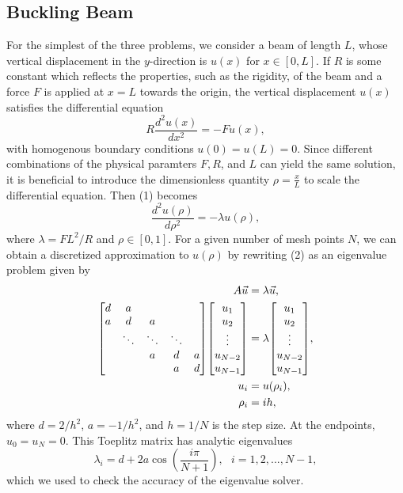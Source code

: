 \documentclass[prb,aps,twocolumn,showpacs,10pt]{revtex4-1}
\newenvironment{psmallmatrix}
  {\left[\begin{matrix}}
  {\end{matrix}\right]}
\begin{document}
\subsection{Buckling Beam}
For the simplest of the three problems, we consider a beam of length $L$, whose vertical displacement in the $y$-direction is $u(x)$ for $x \in [0,L]$. If $R$ is some constant which reflects the properties, such as the rigidity, of the beam and a force $F$ is applied at $x=L$ towards the origin, the vertical displacement $u(x)$ satisfies the differential equation
\begin{equation}
R\frac{d^2 u(x)}{dx^2} = -Fu(x),
\end{equation}
with homogenous boundary conditions $u(0)=u(L)=0$. Since different combinations of the physical paramters $F, R$, and $L$ can yield the same solution, it is beneficial to introduce the dimensionless quantity $\rho = \frac{x}{L}$ to scale the differential equation. Then (1) becomes
\begin{equation}
\frac{d^2 u(\rho)}{d\rho^2} = -\lambda u(\rho),
\end{equation}
where $\lambda = FL^2/R$ and $\rho \in [0,1]$. For a given number of mesh points $N$, we can obtain a discretized approximation to $u(\rho)$ by rewriting (2) as an eigenvalue problem given by
\begin{align}
\label{eqn:eqlabel}
\begin{split}
A\vec{u} &= \lambda \vec{u},
\\
\begin{psmallmatrix} d&a& \\
a&d&a\\
&\ddots&\ddots&\ddots\\
&&a&d&a\\
&&&a&d\\
\end{psmallmatrix}
\begin{psmallmatrix}
u_1\\u_2\\ \vdots \\ u_{N-2}\\ u_{N-1}
\end{psmallmatrix}&=
\lambda
\begin{psmallmatrix}
u_1\\u_2\\ \vdots \\ u_{N-2}\\ u_{N-1}
\end{psmallmatrix},\\
u_i &= u(\rho_i),\\
\rho_i &= ih,\\
\end{split}
\end{align}
where $d = 2/h^2$, $a = -1/h^2$, and $h = 1/N$ is the step size. At the endpoints, $u_0 = u_N = 0$. This Toeplitz matrix has analytic eigenvalues
\begin{equation}
\lambda_i = d+2a\cos \left( \frac{i \pi}{N+1} \right) , \ \ \ i = 1, 2, ..., N-1,
\end{equation}
which we used to check the accuracy of the eigenvalue solver.
\end{document}
